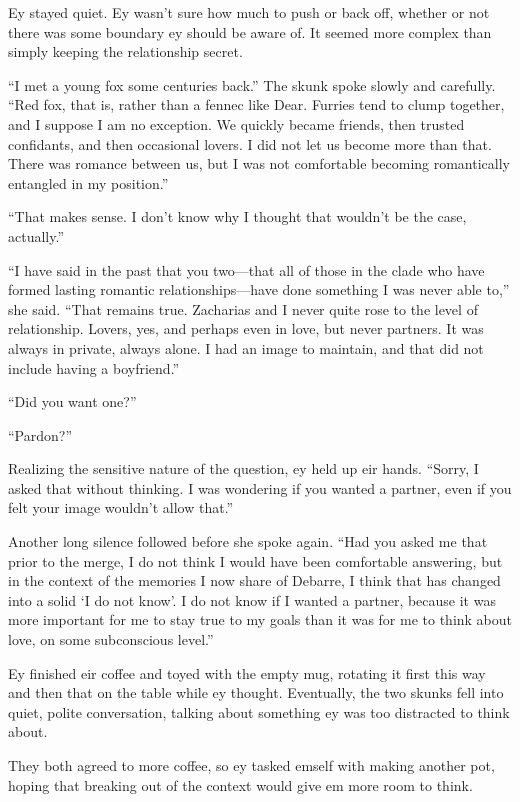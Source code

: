 Ey stayed quiet. Ey wasn't sure how much to push or back off, whether or not there was some boundary ey should be aware of. It seemed more complex than simply keeping the relationship secret.

``I met a young fox some centuries back.'' The skunk spoke slowly and carefully. ``Red fox, that is, rather than a fennec like Dear. Furries tend to clump together, and I suppose I am no exception. We quickly became friends, then trusted confidants, and then occasional lovers. I did not let us become more than that. There was romance between us, but I was not comfortable becoming romantically entangled in my position.''

``That makes sense. I don't know why I thought that wouldn't be the case, actually.''

``I have said in the past that you two—that all of those in the clade who have formed lasting romantic relationships—have done something I was never able to,'' she said. ``That remains true. Zacharias and I never quite rose to the level of relationship. Lovers, yes, and perhaps even in love, but never partners. It was always in private, always alone. I had an image to maintain, and that did not include having a boyfriend.''

``Did you want one?''

``Pardon?''

Realizing the sensitive nature of the question, ey held up eir hands. ``Sorry, I asked that without thinking. I was wondering if you wanted a partner, even if you felt your image wouldn't allow that.''

Another long silence followed before she spoke again. ``Had you asked me that prior to the merge, I do not think I would have been comfortable answering, but in the context of the memories I now share of Debarre, I think that has changed into a solid `I do not know'. I do not know if I wanted a partner, because it was more important for me to stay true to my goals than it was for me to think about love, on some subconscious level.''

Ey finished eir coffee and toyed with the empty mug, rotating it first this way and then that on the table while ey thought. Eventually, the two skunks fell into quiet, polite conversation, talking about something ey was too distracted to think about.

They both agreed to more coffee, so ey tasked emself with making another pot, hoping that breaking out of the context would give em more room to think.

